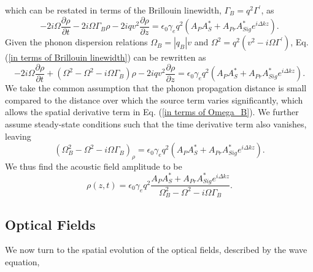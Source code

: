 \documentclass[pdflatex,iicol]{sn-jnl}%
\begin{document}
which can be restated in terms of the Brillouin linewidth, $\Gamma_{B} = q^{2}\Gamma^{\prime}$, as
\begin{equation}
    -2i\Omega\frac{\partial\rho}{\partial t} - 2i\Omega\Gamma_{B}\rho - 2iqv^{2}\frac{\partial\rho}{\partial z} = \epsilon_{0}\gamma_{e}q^{2}(A_{P}A_{S}^{*} + A_{Pr}A_{Sig}^{*}e^{i\Delta kz}).
    \label{in terms of Brillouin linewidth}
\end{equation}
Given the phonon dispersion relations $\Omega_{B} = |q_{B}|v$ and $\Omega^{2} = q^{2}\left(v^{2} - i\Omega\Gamma^{\prime}\right)$, Eq. (\ref{in terms of Brillouin linewidth}) can be rewritten as
\begin{equation}
    -2i\Omega\frac{\partial\rho}{\partial t} + \left(\Omega^{2} - \Omega^{2} - i\Omega\Gamma_{B}\right)\rho - 2iqv^{2}\frac{\partial\rho}{\partial z} = \epsilon_{0}\gamma_{e}q^{2}(A_{P}A_{S}^{*} + A_{Pr}A_{Sig}^{*}e^{i\Delta kz}).
    \label{in terms of Omega_B}
\end{equation}
We take the common assumption that the phonon propagation distance is small compared to the distance over which the source term varies significantly, which allows the spatial derivative term in Eq. (\ref{in terms of Omega_B}). We further assume steady-state conditions such that the time derivative term also vanishes, leaving
\begin{equation}
    (\Omega^{2}_{B} - \Omega^{2} - i\Omega\Gamma_{B})_{\rho} = \epsilon_{0}\gamma_{e}q^{2}(A_{P}A_{S}^{*} + A_{Pr}A_{Sig}^{*}e^{i\Delta kz}).
\end{equation}
We thus find the acoustic field amplitude to be
\begin{equation}
    \rho(z,t) = \epsilon_{0}\gamma_{e}q^{2}\frac{A_{P}A_{S}^{*} + A_{Pr}A_{Sig}^{*}e^{i\Delta kz}}{\Omega_{B}^{2} - \Omega^{2} - i\Omega\Gamma_{B}}.
    \label{Acoustic field amplitude}
\end{equation}
\subsection{Optical Fields}
We now turn to the spatial evolution of the optical fields, described by the wave equation,
\end{document}
